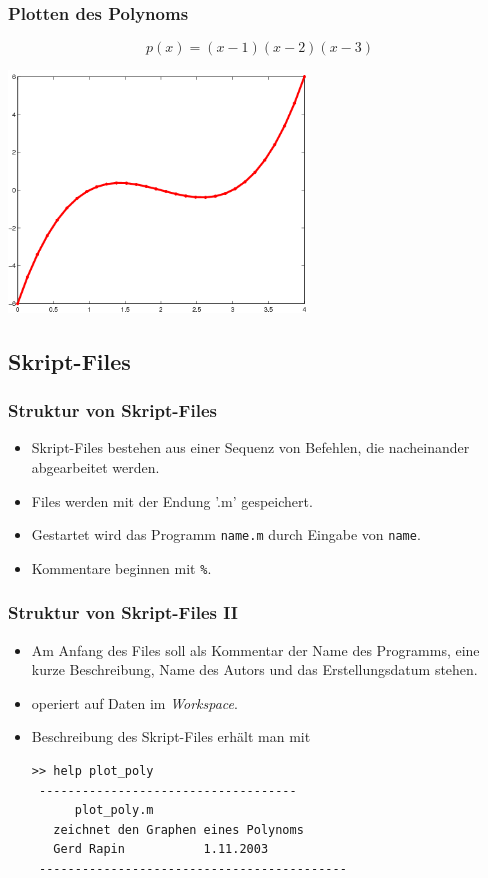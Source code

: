 \begin{frame}[fragile]\frametitle{Plotten des Polynoms}
\[p(x) = (x-1)(x-2)(x-3) \]
\begin{center}
\includegraphics[width=0.6\textwidth]{./figures/polynom_03_11} 
\end{center}

\end{frame}
\subsection{Skript-Files}
\begin{frame}[fragile]\frametitle{Struktur von Skript-Files}
\begin{itemize}
\item Skript-Files bestehen aus einer Sequenz von Befehlen, die
  nacheinander abgearbeitet werden.
\item Files werden mit der Endung '.m' gespeichert. 
\item Gestartet wird das Programm \lstinline!name.m! durch Eingabe von
  \lstinline!name!.
\item Kommentare beginnen mit \lstinline!%!.
\end{itemize}
\end{frame}
\begin{frame}[fragile]\frametitle{Struktur von Skript-Files II}
\begin{itemize}
\item Am Anfang des Files soll als Kommentar der Name des Programms,
  eine kurze Beschreibung, Name des Autors und das Erstellungsdatum stehen. 
\item operiert auf Daten im {\it Workspace}.
\item Beschreibung des Skript-Files erhält man mit
\begin{lstlisting}
>> help plot_poly
 ------------------------------------
      plot_poly.m    
   zeichnet den Graphen eines Polynoms 
   Gerd Rapin           1.11.2003
 -------------------------------------------
\end{lstlisting}
\end{itemize}
\end{frame}
